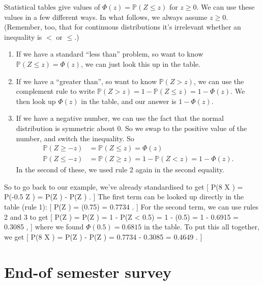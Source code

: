 \documentclass[
  letterpaper,
]{report}
\providecommand{\tightlist}{%
  \setlength{\itemsep}{0pt}\setlength{\parskip}{0pt}}\usepackage{longtable,booktabs,array}
\theoremstyle{definition}
\theoremstyle{definition}
\theoremstyle{remark}
\begin{document}
Statistical tables give values of \(\Phi(z) = \mathbb P(Z \leq z)\) for
\(z \geq 0\). We can use these values in a few different ways. In what
follows, we always assume \(z \geq 0\). (Remember, too, that for
continuous distributions it's irrelevant whether an inequality is \(<\)
or \(\leq\).)

\begin{enumerate}
\def\labelenumi{\arabic{enumi}.}
\tightlist
\item
  If we have a standard ``less than'' problem, so want to know
  \(\mathbb P(Z \leq z) = \Phi(z)\), we can just look this up in the
  table.
\item
  If we have a ``greater than'', so want to know \(\mathbb P(Z > z)\),
  we can use the complement rule to write
  \(\mathbb P(Z > z) = 1 - \mathbb P(Z \leq z) = 1 - \Phi(z)\). We then
  look up \(\Phi(z)\) in the table, and our answer is \(1 - \Phi(z)\).
\item
  If we have a negative number, we can use the fact that the normal
  distribution is symmetric about 0. So we swap to the positive value of
  the number, and switch the inequality. So \begin{align*}
  \mathbb P(Z \geq -z) &= \mathbb P(Z \leq z) = \Phi(z) \\
  \mathbb P(Z \leq -z) &= \mathbb P(Z \geq z) = 1 - \mathbb P(Z < z) = 1 - \Phi(z) .
  \end{align*} In the second of these, we used rule 2 again in the
  second equality.
\end{enumerate}

So to go back to our example, we've already standardised to get {[}
\mathbb P(8 \leq X ) = \mathbb P(-0.5 \leq Z ) =
\mathbb P(Z ) - \mathbb P(Z ) . {]} The first term can
be looked up directly in the table (rule 1): {[} \mathbb P(Z )
= \Phi(0.75) = 0.7734 . {]} For the second term, we can use rules 2 and
3 to get {[} \mathbb P(Z ) = \mathbb P(Z ) = 1 -
\mathbb P(Z \textless{} 0.5) = 1 - \Phi(0.5) = 1 - 0.6915 = 0.3085 , {]}
where we found \(\Phi(0.5) = 0.6815\) in the table. To put this all
together, we get {[} \mathbb P(8 \leq X ) = \mathbb P(Z
) - \mathbb P(Z ) = 0.7734 - 0.3085 = 0.4649 . {]}

\hypertarget{end-of-semester-survey}{%
\section{End-of semester survey}\label{end-of-semester-survey}}
\end{document}
